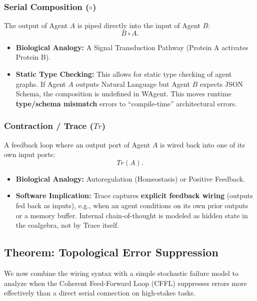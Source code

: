 \subsubsection{Serial Composition ($\circ$)}

The output of Agent $A$ is piped directly into the input of Agent $B$:
\begin{equation}
B \circ A.
\label{eq:serial-composition}
\end{equation}
\begin{itemize}[leftmargin=*]
\item \textbf{Biological Analogy:} A Signal Transduction Pathway (Protein A activates Protein B).
\item \textbf{Static Type Checking:} This allows for static type checking of agent graphs. If Agent $A$ outputs
Natural Language but Agent $B$ expects JSON Schema, the composition is undefined in WAgent. This moves runtime
\textbf{type/schema mismatch} errors to ``compile-time'' architectural errors.
\end{itemize}

\subsubsection{Contraction / Trace ($Tr$)}

A feedback loop where an output port of Agent $A$ is wired back into one of its own input ports:
\begin{equation}
Tr(A).
\label{eq:trace-feedback}
\end{equation}
\begin{itemize}[leftmargin=*]
\item \textbf{Biological Analogy:} Autoregulation (Homeostasis) or Positive Feedback.
\item \textbf{Software Implication:} Trace captures \textbf{explicit feedback wiring} (outputs fed back as inputs),
e.g., when an agent conditions on its own prior outputs or a memory buffer. Internal chain-of-thought is
modeled as hidden state in the coalgebra, not by Trace itself.
\end{itemize}

\subsection{Theorem: Topological Error Suppression}

We now combine the wiring syntax with a simple stochastic failure model to analyze when the Coherent
Feed-Forward Loop (CFFL) suppresses errors more effectively than a direct serial connection on
high-stakes tasks.

